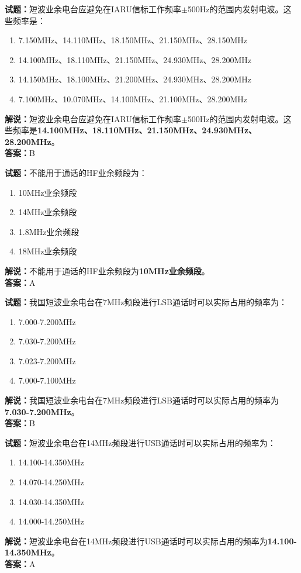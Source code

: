 \documentclass{ctexbook}
\begin{document}
\noindent\textbf{试题：}短波业余电台应避免在IARU信标工作频率$\pm$500Hz的范围内发射电波。这些频率是：%
\begin{enumerate}[leftmargin=3em]
\item 7.150MHz、14.110MHz、18.150MHz、21.150MHz、28.150MHz
\item 14.100MHz、18.110MHz、21.150MHz、24.930MHz、28.200MHz
\item 14.150MHz、18.100MHz、21.200MHz、24.930MHz、28.200MHz
\item 7.100MHz、10.070MHz、14.100MHz、21.100MHz、28.200MHz
\end{enumerate}
\noindent\textbf{解说：}短波业余电台应避免在IARU信标工作频率$\pm$500Hz的范围内发射电波。这些频率是\textbf{14.100MHz、18.110MHz、21.150MHz、24.930MHz、28.200MHz}。\\\noindent\textbf{答案：}B%



\bigskip


\noindent\textbf{试题：}不能用于通话的HF业余频段为：
\begin{enumerate}[leftmargin=3em]
\item 10MHz业余频段
\item 14MHz业余频段
\item 1.8MHz业余频段
\item 18MHz业余频段
\end{enumerate}
\noindent\textbf{解说：}不能用于通话的HF业余频段为\textbf{10MHz业余频段}。\\\noindent\textbf{答案：}A



\bigskip


\noindent\textbf{试题：}我国短波业余电台在7MHz频段进行LSB通话时可以实际占用的频率为：
\begin{enumerate}[leftmargin=3em]
\item 7.000-7.200MHz
\item 7.030-7.200MHz
\item 7.023-7.200MHz
\item 7.000-7.100MHz
\end{enumerate}
\noindent\textbf{解说：}我国短波业余电台在7MHz频段进行LSB通话时可以实际占用的频率为\textbf{7.030-7.200MHz}。\\\noindent\textbf{答案：}B



\bigskip


\noindent\textbf{试题：}短波业余电台在14MHz频段进行USB通话时可以实际占用的频率为：
\begin{enumerate}[leftmargin=3em]
\item 14.100-14.350MHz
\item 14.070-14.250MHz
\item 14.030-14.350MHz
\item 14.000-14.250MHz
\end{enumerate}
\noindent\textbf{解说：}短波业余电台在14MHz频段进行USB通话时可以实际占用的频率为\textbf{14.100-14.350MHz}。\\\noindent\textbf{答案：}A
\end{document}
